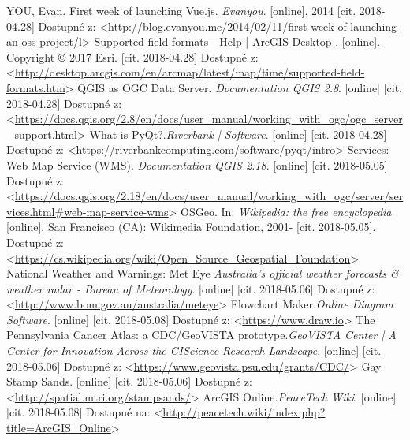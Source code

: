 \documentclass[12pt,a4paper]{article}
\begin{document}
\begin{thebibliography}{99}
YOU, Evan. First week of launching Vue.js. \textit{Evanyou}. [online]. 2014
[cit. 2018-04.28]
Dostupné z: \textless\url{http://blog.evanyou.me/2014/02/11/first-week-of-launching-an-oss-project/l}\textgreater
{}
Supported field formats—Help | ArcGIS Desktop \textit{}. [online]. Copyright © 2017 Esri.
[cit. 2018-04.28]
Dostupné z: \textless\url{http://desktop.arcgis.com/en/arcmap/latest/map/time/supported-field-formats.htm}\textgreater
{}
QGIS as OGC Data Server. \textit{Documentation QGIS 2.8}. [online]
[cit. 2018-04.28]
Dostupné z: \textless\url{https://docs.qgis.org/2.8/en/docs/user_manual/working_with_ogc/ogc_server_support.html}\textgreater
{}
What is PyQt?.\textit{Riverbank | Software}. [online]
[cit. 2018-04.28]
Dostupné z:
\textless\url{https://riverbankcomputing.com/software/pyqt/intro}\textgreater
{}
Services: Web Map Service (WMS). \textit{Documentation QGIS 2.18}. [online]
[cit. 2018-05.05]
Dostupné z: \textless\url{https://docs.qgis.org/2.18/en/docs/user_manual/working_with_ogc/server/services.html#web-map-service-wms}\textgreater
{}
OSGeo. In: \textit{Wikipedia: the free encyclopedia} [online]. San Francisco (CA): Wikimedia Foundation, 2001- 
[cit. 2018-05.05]. Dostupné z: \textless\url{https://cs.wikipedia.org/wiki/Open_Source_Geospatial_Foundation}\textgreater
{}
National Weather and Warnings: Met Eye \textit{Australia's official weather forecasts \& weather radar - Bureau of Meteorology}. [online]
[cit. 2018-05.06] Dostupné z: \textless\url{http://www.bom.gov.au/australia/meteye}\textgreater
{}
Flowchart Maker.\textit{Online Diagram Software}. [online] [cit. 2018-05.08]
Dostupné z: \textless\url{https://www.draw.io}\textgreater
\newpage
{}
The Pennsylvania Cancer Atlas: a CDC/GeoVISTA prototype.\textit{GeoVISTA Center | A Center for Innovation Across the GIScience Research Landscape}. [online] [cit. 2018-05.06]
Dostupné z: \textless\url{https://www.geovista.psu.edu/grants/CDC/}\textgreater
{}
Gay Stamp Sands. [online] [cit. 2018-05.06]
Dostupné z: \textless\url{http://spatial.mtri.org/stampsands/}\textgreater
{}
ArcGIS Online.\textit{PeaceTech Wiki}. [online] [cit. 2018-05.08]
Dostupné na: \textless\url{http://peacetech.wiki/index.php?title=ArcGIS_Online}\textgreater
\end{thebibliography}


\end{document}
